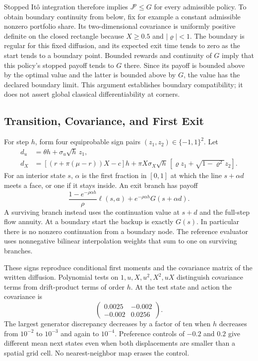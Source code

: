 Stopped It\^o integration therefore implies $J^p\leq G$ for every admissible policy. To obtain boundary continuity from below, fix for example a constant admissible nonzero portfolio share. Its two-dimensional covariance is uniformly positive definite on the closed rectangle because $X\geq0.5$ and $|\varrho|<1$. The boundary is regular for this fixed diffusion, and its expected exit time tends to zero as the start tends to a boundary point. Bounded rewards and continuity of $G$ imply that this policy's stopped payoff tends to $G$ there. Since its payoff is bounded above by the optimal value and the latter is bounded above by $G$, the value has the declared boundary limit. This argument establishes boundary compatibility; it does not assert global classical differentiability at corners.

\subsection{Transition, Covariance, and First Exit}
For step $h$, form four equiprobable sign pairs $(z_1,z_2)\in\{-1,1\}^2$. Let
\begin{align*}
 d_u&=\theta h+\sigma_u\sqrt h\,z_1,\\
 d_X&=[(r+\pi(\mu-r))X-c]h
      +\pi X\sigma_X\sqrt h\,[\varrho z_1+\sqrt{1-\varrho^2}z_2].
\end{align*}
For an interior state $s$, $\alpha$ is the first fraction in $[0,1]$ at which the line $s+\alpha d$ meets a face, or one if it stays inside. An exit branch has payoff
\[
 \frac{1-e^{-\rho\alpha h}}{\rho}\ell(s,a)
       +e^{-\rho\alpha h}G(s+\alpha d).
\]
A surviving branch instead uses the continuation value at $s+d$ and the full-step flow annuity. At a boundary start the backup is exactly $G(s)$. In particular there is no nonzero continuation from a boundary node. The reference evaluator uses nonnegative bilinear interpolation weights that sum to one on surviving branches.

These signs reproduce conditional first moments and the covariance matrix of the written diffusion. Polynomial tests on $1,u,X,u^2,X^2,uX$ distinguish covariance terms from drift-product terms of order $h$. At the test state and action the covariance is
\[
 \begin{pmatrix}0.0025&-0.002\\-0.002&0.0256\end{pmatrix}.
\]
The largest generator discrepancy decreases by a factor of ten when $h$ decreases from $10^{-2}$ to $10^{-3}$ and again to $10^{-4}$. Preference controls of $-0.2$ and $0.2$ give different mean next states even when both displacements are smaller than a spatial grid cell. No nearest-neighbor map erases the control.


